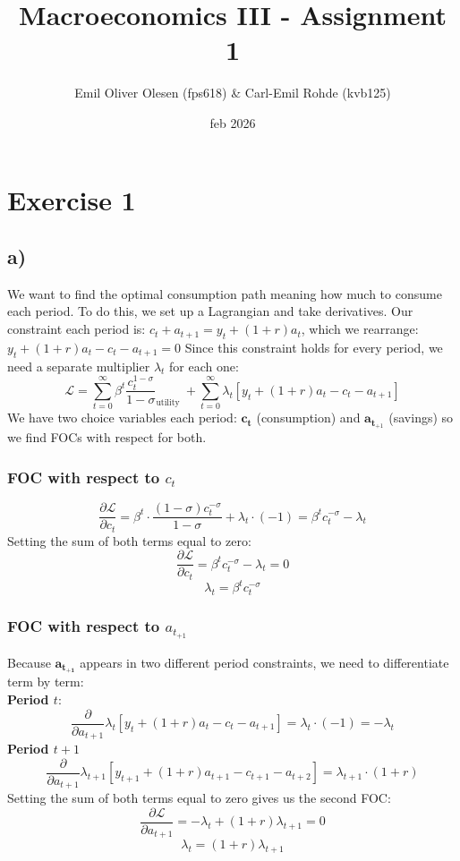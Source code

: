 \documentclass[12pt]{article}
\title{Macroeconomics III - Assignment 1}
\author{Emil Oliver Olesen (fps618) \& Carl-Emil Rohde (kvb125)}
\date{feb 2026}
\begin{document}
\maketitle

\section{Exercise 1}
\subsection{a)}
We want to find the optimal consumption path meaning how much to consume each period. To do this, we set up a Lagrangian and take derivatives. Our constraint each period is: $c_t+a_{t+1}=y_t+(1+r) a_t$, which we rearrange: $y_t+(1+r) a_t-c_t-a_{t+1}=0$ Since this constraint holds for every period, we need a separate multiplier $\lambda_t$ for each one: 
$$
\mathcal{L}=\sum_{t=0}^{\infty} \beta^t \frac{c_t^{1-\sigma}}{1-\sigma}_{\text {utility }}+\sum_{t=0}^{\infty} \lambda_t\left[y_t+(1+r) a_t-c_t-a_{t+1}\right]
$$
We have two choice variables each period: $\mathbf{c}_{\mathbf{t}}$ (consumption) and $\mathbf{a}_{\mathbf{t}_{+1}}$ (savings) so we find FOCs with respect for both. 
\subsubsection{FOC with respect to $c_t$}
$$
\frac{\partial \mathcal{L}}{\partial c_t}=\beta^t \cdot \frac{(1-\sigma) c_t^{-\sigma}}{1-\sigma}+\lambda_t \cdot(-1)=\beta^t c_t^{-\sigma}-\lambda_t
$$
Setting the sum of both terms equal to zero:
$$
\frac{\partial \mathcal{L}}{\partial c_t}=\beta^t c_t^{-\sigma}-\lambda_t=0
$$
$$
\boxed{\lambda_t=\beta^t c_t^{-\sigma}}
$$

\subsubsection{FOC with respect to $a_{t_{+1}}$}
Because $\mathbf{a}_{\mathbf{t}_{\mathbf{+ 1}}}$ appears in two different period constraints, we need to differentiate term by term:
\\
\textbf{Period $t$}:
$$
\frac{\partial}{\partial a_{t+1}} \lambda_t\left[y_t+(1+r) a_t-c_t-a_{t+1}\right]=\lambda_t \cdot(-1)=-\lambda_t
$$
\textbf{Period $t+1$}
$$
\frac{\partial}{\partial a_{t+1}} \lambda_{t+1}\left[y_{t+1}+(1+r) a_{t+1}-c_{t+1}-a_{t+2}\right]=\lambda_{t+1} \cdot(1+r)
$$
Setting the sum of both terms equal to zero gives us the second FOC:
$$
\frac{\partial \mathcal{L}}{\partial a_{t+1}}=-\lambda_t+(1+r) \lambda_{t+1}=0
$$
$$\boxed{\lambda_t=(1+r) \lambda_{t+1}}$$
\end{document}
